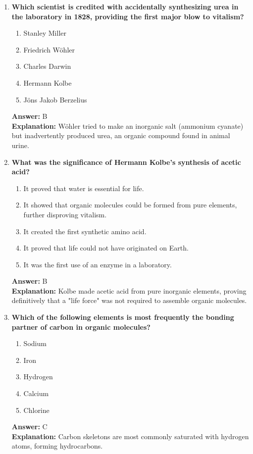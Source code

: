 \documentclass[11pt, a4paper]{article}
\begin{document}
\begin{enumerate}
\item \textbf{Which scientist is credited with accidentally synthesizing urea in the laboratory in 1828, providing the first major blow to vitalism?}
\begin{enumerate}[label=\Alph*.]
    \item Stanley Miller
    \item Friedrich Wöhler
    \item Charles Darwin
    \item Hermann Kolbe
    \item Jöns Jakob Berzelius
\end{enumerate}
\textbf{Answer:} B \\
\textbf{Explanation:} Wöhler tried to make an inorganic salt (ammonium cyanate) but inadvertently produced urea, an organic compound found in animal urine.

\item \textbf{What was the significance of Hermann Kolbe's synthesis of acetic acid?}
\begin{enumerate}[label=\Alph*.]
    \item It proved that water is essential for life.
    \item It showed that organic molecules could be formed from pure elements, further disproving vitalism.
    \item It created the first synthetic amino acid.
    \item It proved that life could not have originated on Earth.
    \item It was the first use of an enzyme in a laboratory.
\end{enumerate}
\textbf{Answer:} B \\
\textbf{Explanation:} Kolbe made acetic acid from pure inorganic elements, proving definitively that a "life force" was not required to assemble organic molecules.

\item \textbf{Which of the following elements is most frequently the bonding partner of carbon in organic molecules?}
\begin{enumerate}[label=\Alph*.]
    \item Sodium
    \item Iron
    \item Hydrogen
    \item Calcium
    \item Chlorine
\end{enumerate}
\textbf{Answer:} C \\
\textbf{Explanation:} Carbon skeletons are most commonly saturated with hydrogen atoms, forming hydrocarbons.


\end{enumerate}
\end{document}
